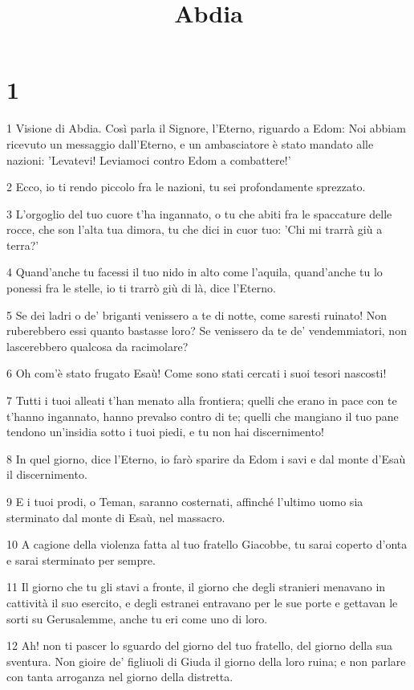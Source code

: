 

\title{Abdia}


\chapter{1}

\par 1 Visione di Abdia. Così parla il Signore, l'Eterno, riguardo a Edom: Noi abbiam ricevuto un messaggio dall'Eterno, e un ambasciatore è stato mandato alle nazioni: 'Levatevi! Leviamoci contro Edom a combattere!'
\par 2 Ecco, io ti rendo piccolo fra le nazioni, tu sei profondamente sprezzato.
\par 3 L'orgoglio del tuo cuore t'ha ingannato, o tu che abiti fra le spaccature delle rocce, che son l'alta tua dimora, tu che dici in cuor tuo: 'Chi mi trarrà giù a terra?'
\par 4 Quand'anche tu facessi il tuo nido in alto come l'aquila, quand'anche tu lo ponessi fra le stelle, io ti trarrò giù di là, dice l'Eterno.
\par 5 Se dei ladri o de' briganti venissero a te di notte, come saresti ruinato! Non ruberebbero essi quanto bastasse loro? Se venissero da te de' vendemmiatori, non lascerebbero qualcosa da racimolare?
\par 6 Oh com'è stato frugato Esaù! Come sono stati cercati i suoi tesori nascosti!
\par 7 Tutti i tuoi alleati t'han menato alla frontiera; quelli che erano in pace con te t'hanno ingannato, hanno prevalso contro di te; quelli che mangiano il tuo pane tendono un'insidia sotto i tuoi piedi, e tu non hai discernimento!
\par 8 In quel giorno, dice l'Eterno, io farò sparire da Edom i savi e dal monte d'Esaù il discernimento.
\par 9 E i tuoi prodi, o Teman, saranno costernati, affinché l'ultimo uomo sia sterminato dal monte di Esaù, nel massacro.
\par 10 A cagione della violenza fatta al tuo fratello Giacobbe, tu sarai coperto d'onta e sarai sterminato per sempre.
\par 11 Il giorno che tu gli stavi a fronte, il giorno che degli stranieri menavano in cattività il suo esercito, e degli estranei entravano per le sue porte e gettavan le sorti su Gerusalemme, anche tu eri come uno di loro.
\par 12 Ah! non ti pascer lo sguardo del giorno del tuo fratello, del giorno della sua sventura. Non gioire de' figliuoli di Giuda il giorno della loro ruina; e non parlare con tanta arroganza nel giorno della distretta.
